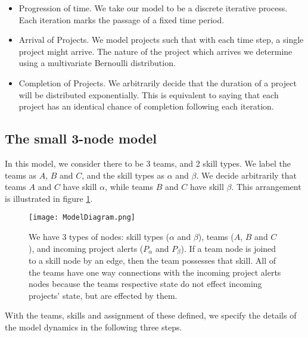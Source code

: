 \begin{itemize}
	\item Progression of time. We take our model to be a discrete iterative process. Each iteration marks the passage of a fixed time period. 

	\item Arrival of Projects. We model projects such that with each time step, a single project might arrive. The nature of the project which arrives we determine using a multivariate Bernoulli distribution.
	
	\item Completion of Projects. We arbitrarily decide that the duration of a project will be distributed exponentially. This is equivalent to saying that each project has an identical chance of completion following each iteration.
\end{itemize}


\subsection{The small 3-node model}
In this model, we consider there to be 3 teams, and 2 skill types. We label the teams as $A$, $B$ and $C$, and the skill types as $\alpha$ and $\beta$. We decide arbitrarily that teams $A$ and $C$ have skill $\alpha$, while teams $B$ and $C$ have skill $\beta$. This arrangement is illustrated in figure \ref{fig:diagram1}.

\begin{figure}[ht]
	\centering

	\texttt{[image: ModelDiagram.png]}
	\caption{We have 3 types of nodes: skill types ($\alpha$ and $\beta$), teams ($A$, $B$ and $C$), and incoming project alerts ($P_\alpha$ and $P_\beta$). If a team node is joined to a skill node by an edge, then the team possesses that skill. All of the teams have one way connections with the incoming project alerts nodes because the teams respective state do not effect incoming projects' state, but are effected by them.}
	\label{fig:diagram1}
\end{figure}

With the teams, skills and assignment of these defined, we specify the details of the model dynamics in the following three steps.

